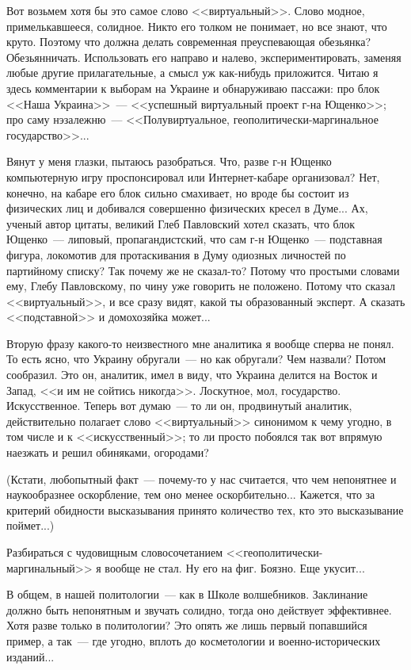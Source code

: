 \documentclass{scrbook}
\newcommand{\flqq}{<<}
\newcommand{\frqq}{>>}
\newcommand{\mdash}{~--- }
\begin{document}
Вот возьмем хотя бы это самое слово {\flqq}виртуальный{\frqq}. Слово модное, примелькавшееся, солидное. Никто его толком не понимает, но все знают, что круто. Поэтому что должна делать современная преуспевающая обезьянка? Обезьянничать. Использовать его направо и налево, экспериментировать, заменяя любые другие прилагательные, а смысл уж как-нибудь приложится. Читаю я здесь комментарии к выборам на Украине и обнаруживаю пассажи: про блок {\flqq}Наша Украина{\frqq}{\mdash}{\flqq}успешный виртуальный проект г-на Ющенко{\frqq}; про саму нэзалежню{\mdash}{\flqq}Полувиртуальное, геополитически-маргинальное государство{\frqq}...

Вянут у меня глазки, пытаюсь разобраться. Что, разве г-н Ющенко компьютерную игру проспонсировал или Интернет-кабаре организовал? Нет, конечно, на кабаре его блок сильно смахивает, но вроде бы состоит из физических лиц и добивался совершенно физических кресел в Думе... Ах, ученый автор цитаты, великий Глеб Павловский хотел сказать, что блок Ющенко{\mdash}липовый, пропагандистский, что сам г-н Ющенко{\mdash}подставная фигура, локомотив для протаскивания в Думу одиозных личностей по партийному списку? Так почему же не сказал-то? Потому что простыми словами ему, Глебу Павловскому, по чину уже говорить не положено. Потому что сказал {\flqq}виртуальный{\frqq}, и все сразу видят, какой ты образованный эксперт. А сказать {\flqq}подставной{\frqq} и домохозяйка может...

Вторую фразу какого-то неизвестного мне аналитика я вообще сперва не понял. То есть ясно, что Украину обругали{\mdash}но как обругали? Чем назвали? Потом сообразил. Это он, аналитик, имел в виду, что Украина делится на Восток и Запад, {\flqq}и им не сойтись никогда{\frqq}. Лоскутное, мол, государство. Искусственное. Теперь вот думаю{\mdash}то ли он, продвинутый аналитик, действительно полагает слово {\flqq}виртуальный{\frqq} синонимом к чему угодно, в том числе и к {\flqq}искусственный{\frqq}; то ли просто побоялся так вот впрямую наезжать и решил обиняками, огородами?

(Кстати, любопытный факт{\mdash}почему-то у нас считается, что чем непонятнее и наукообразнее оскорбление, тем оно менее оскорбительно... Кажется, что за критерий обидности высказывания принято количество тех, кто это высказывание поймет...)

Разбираться с чудовищным словосочетанием {\flqq}геополитически-маргинальный{\frqq} я вообще не стал. Ну его на фиг. Боязно. Еще укусит...

В общем, в нашей политологии{\mdash}как в Школе волшебников. Заклинание должно быть непонятным и звучать солидно, тогда оно действует эффективнее. Хотя разве только в политологии? Это опять же лишь первый попавшийся пример, а так{\mdash}где угодно, вплоть до косметологии и военно-исторических изданий...
\end{document}
